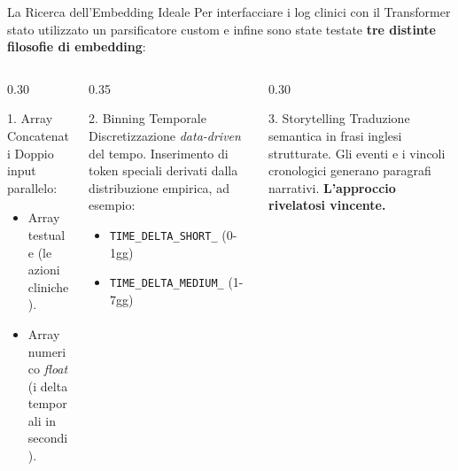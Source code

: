 \documentclass[aspectratio=169, 10pt]{beamer}
\begin{document}
\begin{frame}{La Ricerca dell'Embedding Ideale}
  Per interfacciare i log clinici con il Transformer  stato utilizzato un parsificatore custom e infine 
  sono state testate \textbf{tre distinte filosofie di embedding}:

  \vspace{0.3em}
  \begin{columns}[T]
    \begin{column}{0.30\textwidth}
      \begin{block}{1. Array Concatenati}
        \small
        Doppio input parallelo:
        \begin{itemize}
            \item Array testuale (le azioni cliniche).
            \item Array numerico \textit{float} (i delta temporali in secondi).
        \end{itemize}
      \end{block}
    \end{column}

    \begin{column}{0.35\textwidth}
      \begin{block}{2. Binning Temporale}
        \small
        Discretizzazione \textit{data-driven} del tempo. Inserimento di token 
        speciali derivati dalla distribuzione empirica, ad esempio:
        \begin{itemize}
          \item \small \texttt{TIME\_DELTA\_SHORT\_} (0-1gg)
          \item \small \texttt{TIME\_DELTA\_MEDIUM\_} (1-7gg)
        \end{itemize}
      \end{block}
    \end{column}

    \begin{column}{0.30\textwidth}
      \begin{exampleblock}{3. Storytelling}
        \small
        Traduzione semantica in frasi inglesi strutturate. 
        Gli eventi e i vincoli cronologici generano paragrafi narrativi.
        \textbf{L'approccio rivelatosi vincente.}
      \end{exampleblock}
    \end{column}
  \end{columns}
\end{frame}
\end{document}
